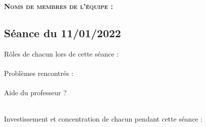 \documentclass[a4paper,12pt,french]{article}
\begin{document}
\textbf{\textsc{Noms de membres de l'équipe :}}\\



\subsection*{Séance du 11/01/2022}

Rôles de chacun lors de cette séance :\\

\\

Problèmes rencontrés :\\

\\

Aide du professeur ?\\

\\

\newpage

Investissement et concentration de chacun pendant cette séance :\\

\\
\end{document}
